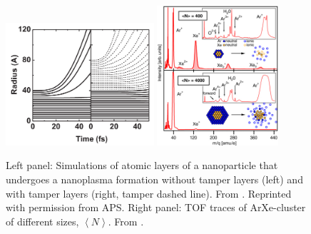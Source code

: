 \begin{figure}
	\centering
		\includegraphics[width=0.49\textwidth]{images/tamper-layers.png}
		\includegraphics[width=0.4\textwidth]{images/Hoener-image.jpg}
	\caption[Tamper layers and nanoparticles that undergo a nanoplasma formation.]{Left panel: Simulations of atomic layers of a nanoparticle that undergoes a nanoplasma formation without tamper layers (left) and with tamper layers (right, tamper dashed line). From \citep{Hau-Riege-2007-PRL}. Reprinted with permission from APS. Right panel: TOF traces of ArXe-cluster of different sizes, $\left\langle N\right\rangle$. From \citep[\href{https://creativecommons.org/licenses/by/3.0/}{\ccby}]{Hoener-2008-JPB}.}
	\label{fig:sacrificial-image}
\end{figure}
%
